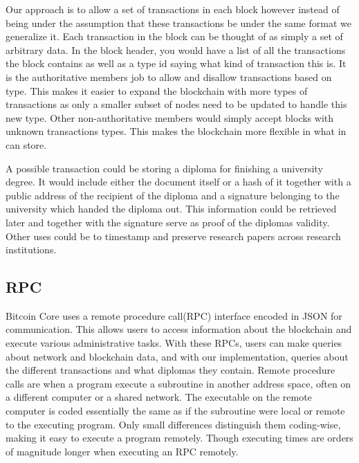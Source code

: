 \documentclass[11pt]{article}
\begin{document}
Our approach is to allow a set of transactions in each block however instead of being under the assumption that these transactions be under the same format we generalize it. Each transaction in the block can be thought of as simply a set of arbitrary data. In the block header, you would have a list of all the transactions the block contains as well as a type id saying what kind of transaction this is. It is the authoritative members job to allow and disallow transactions based on type. This makes it easier to expand the blockchain with more types of transactions as only a smaller subset of nodes need to be updated to handle this new type. Other non-authoritative members would simply accept blocks with unknown transactions types. This makes the blockchain more flexible in what in can store.


A possible transaction could be storing a diploma for finishing a university degree. It would include either the document itself or a hash of it together with a public address of the recipient of the diploma and a signature belonging to the university which handed the diploma out. This information could be retrieved later and together with the signature serve as proof of the diplomas validity. Other uses could be to timestamp and preserve research papers across research institutions. 

\subsection{RPC}
Bitcoin Core uses a remote procedure call(RPC) interface encoded in JSON for communication. This allows users to access information about the blockchain and execute various administrative tasks. With these RPCs, users can make queries about network and blockchain data, and with our implementation, queries about the different transactions and what diplomas they contain. Remote procedure calls are when a program execute a subroutine in another address space, often on a different computer or a shared network. The executable on the remote computer is coded essentially the same as if the subroutine were local or remote to the executing program. Only small differences distinguish them coding-wise, making it easy to execute a program remotely. Though executing times are orders of magnitude longer when executing an RPC remotely. 
\end{document}
